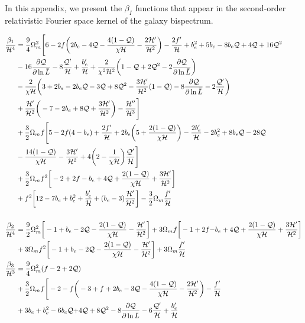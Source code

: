 In this appendix, we present the $\beta_I$ functions that appear in the second-order relativistic Fourier space kernel of the galaxy bispectrum. 

\begin{align} 
\frac{\beta_{1}}{\mathcal{H}^{4}} &= \frac{9}{4}\Omega_{m}^{2}\Bigg[6-2f\bigg(2b_{e}-4\Q-\frac{4(1-\Q)}{\chi\cH}-\frac{2\cH'}{\cH^{2}}\bigg)-\frac{2f'}{\cH}+b_{e}^{2}+5b_{e}-8b_{e}\Q + 4\Q + 16\Q^{2} \nonumber\\ 
& - 16\frac{\p \Q}{\p \ln{\bar{L}}} - 8\frac{\Q'}{\cH} + \frac{b_{e}'}{\cH}+\frac{2}{\chi^{2}\cH^{2}}\bigg(1-\Q+2\Q^{2}-2\frac{\p \Q}{\p \ln{\bar{L}}}\bigg)
 \nonumber\\ 
& - \frac{2}{\chi\cH}\bigg(3+2b_{e}-2b_{e}\Q-3\Q +8\Q^{2}-\frac{3\cH'}{\cH^{2}}(1-\Q) -8\frac{\p \Q}{\p \ln{\bar{L}}} - 2\frac{\Q'}{\cH}\bigg) \nonumber \\
& + \frac{\cH'}{\cH^{2}}\bigg(-7-2b_{e}+8\Q+\frac{3\cH'}{\cH^{2}}\bigg) - \frac{\cH''}{\cH^{3}}\Bigg] \nonumber \\
&  +\frac{3}{2}\Omega_{m}f\Bigg[5-2f(4-b_{e})+\frac{2f'}{\cH}+2b_{e}\bigg(5+\frac{2(1-\Q)}{\chi\cH}\bigg)-\frac{2b_{e}'}{\cH} -2b_{e}^{2} + 8b_{e}\Q - 28\Q \nonumber \\
& - \frac{14(1-\Q)}{\chi\cH}-\frac{3\cH'}{\cH^{2}} +4\bigg(2-\frac{1}{\chi\cH}\bigg)\frac{\Q'}{\cH}\Bigg] \nonumber \\
&  +\frac{3}{2}\Omega_{m}f^{2}\bigg[-2+2f-b_{e}+4\Q+\frac{2(1-\Q)}{\chi\cH}+\frac{3\cH'}{\cH^{2}}\bigg] \nonumber \\
&  +f^{2}\bigg[12-7b_{e}+b_{e}^{2}+\frac{b_{e}'}{\cH}+(b_{e}-3)\frac{\cH'}{\cH^{2}}\bigg] - \frac{3}{2}\Omega_{m}\frac{f'}{\cH} \\
\nonumber\\
\frac{\beta_{2}}{\cH^{4}} &= \frac{9}{2}\Omega_{m}^{2}\bigg[-1+b_{e}-2\Q-\frac{2(1-\Q)}{\chi\cH}-\frac{\cH'}{\cH^{2}}\bigg] + 3\Omega_{m}f\bigg[-1+2f{-b_{e}}+4\Q+\frac{2(1-\Q)}{\chi\cH}+\frac{3\cH'}{\cH^{2}}\bigg] \nonumber \\
&  +3\Omega_{m}f^{2}\bigg[-1+b_{e}-2\Q-\frac{2(1-\Q)}{\chi\cH}-\frac{\cH'}{\cH^{2}}\bigg] + 3\Omega_{m}\frac{f'}{\cH}\; \\ 
\frac{\beta_{3}}{\mathcal{H}^{3}} &= \frac{9}{4}\Omega_{m}^{2}(f-2+2\Q) \nonumber \\
&  + \frac{3}{2}\Omega_{m}f\Bigg[-2 -f\bigg(-3+f+2b_{e}-3\Q-\frac{4(1-\Q)}{\chi\cH}-\frac{2\cH'}{\cH^{2}}\bigg)-\frac{f'}{\cH}\nonumber \\
& +{3}b_{e}+b_{e}^{2}-6b_{e}\Q{+4}\Q +8\Q^{2}-8\frac{\p \Q}{\p \ln{\bar{L}}} -6\frac{\Q'}{\cH} +\frac{b_{e}'}{\cH} \nonumber \\

\end{align}
